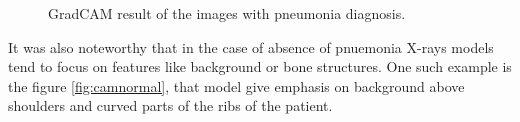 \begin{figure}[H]%
    \centering
    \qquad
    \caption{GradCAM result of the images with pneumonia diagnosis.}%
    \label{fig:campnue}%
\end{figure}

It was also noteworthy that in the case of absence of pnuemonia X-rays models tend to focus on features like background or bone structures.
One such example is the figure \ref{fig:camnormal}, that model give emphasis on background above shoulders and curved parts of the ribs of the patient.



